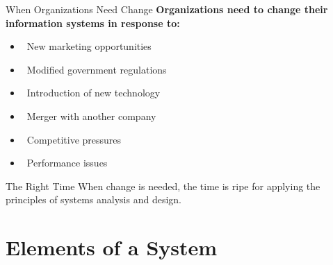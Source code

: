 \documentclass[aspectratio=169]{beamer}
\begin{document}
\begin{frame}{When Organizations Need Change}
    \textbf{Organizations need to change their information systems in response to:}
    
    \begin{itemize}
        \item\, New marketing opportunities
        \item\, Modified government regulations
        \item\, Introduction of new technology
        \item\, Merger with another company
        \item\, Competitive pressures
        \item\, Performance issues
    \end{itemize}
    
    \vspace{0.5cm}
    \begin{exampleblock}{The Right Time}
        When change is needed, the time is ripe for applying the principles of systems analysis and design.
    \end{exampleblock}
\end{frame}

\section{Elements of a System}
\end{document}
